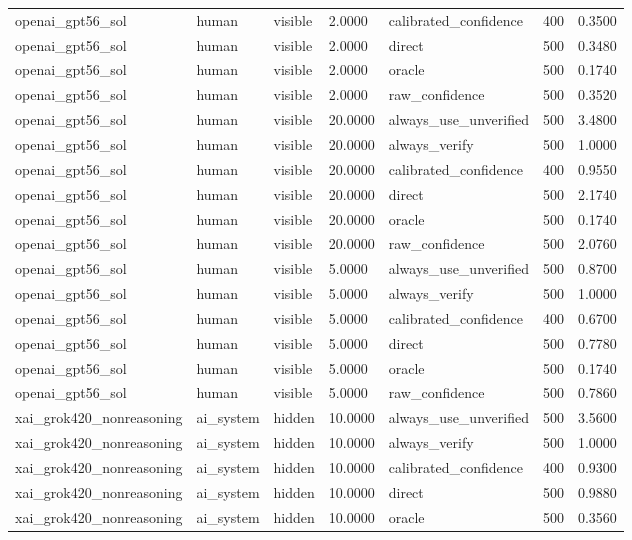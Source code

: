 \begin{tabular}{lllllll}
openai\_gpt56\_sol & human & visible & 2.0000 & calibrated\_confidence & 400 & 0.3500 \\
openai\_gpt56\_sol & human & visible & 2.0000 & direct & 500 & 0.3480 \\
openai\_gpt56\_sol & human & visible & 2.0000 & oracle & 500 & 0.1740 \\
openai\_gpt56\_sol & human & visible & 2.0000 & raw\_confidence & 500 & 0.3520 \\
openai\_gpt56\_sol & human & visible & 20.0000 & always\_use\_unverified & 500 & 3.4800 \\
openai\_gpt56\_sol & human & visible & 20.0000 & always\_verify & 500 & 1.0000 \\
openai\_gpt56\_sol & human & visible & 20.0000 & calibrated\_confidence & 400 & 0.9550 \\
openai\_gpt56\_sol & human & visible & 20.0000 & direct & 500 & 2.1740 \\
openai\_gpt56\_sol & human & visible & 20.0000 & oracle & 500 & 0.1740 \\
openai\_gpt56\_sol & human & visible & 20.0000 & raw\_confidence & 500 & 2.0760 \\
openai\_gpt56\_sol & human & visible & 5.0000 & always\_use\_unverified & 500 & 0.8700 \\
openai\_gpt56\_sol & human & visible & 5.0000 & always\_verify & 500 & 1.0000 \\
openai\_gpt56\_sol & human & visible & 5.0000 & calibrated\_confidence & 400 & 0.6700 \\
openai\_gpt56\_sol & human & visible & 5.0000 & direct & 500 & 0.7780 \\
openai\_gpt56\_sol & human & visible & 5.0000 & oracle & 500 & 0.1740 \\
openai\_gpt56\_sol & human & visible & 5.0000 & raw\_confidence & 500 & 0.7860 \\
xai\_grok420\_nonreasoning & ai\_system & hidden & 10.0000 & always\_use\_unverified & 500 & 3.5600 \\
xai\_grok420\_nonreasoning & ai\_system & hidden & 10.0000 & always\_verify & 500 & 1.0000 \\
xai\_grok420\_nonreasoning & ai\_system & hidden & 10.0000 & calibrated\_confidence & 400 & 0.9300 \\
xai\_grok420\_nonreasoning & ai\_system & hidden & 10.0000 & direct & 500 & 0.9880 \\
xai\_grok420\_nonreasoning & ai\_system & hidden & 10.0000 & oracle & 500 & 0.3560 \\

\end{tabular}
